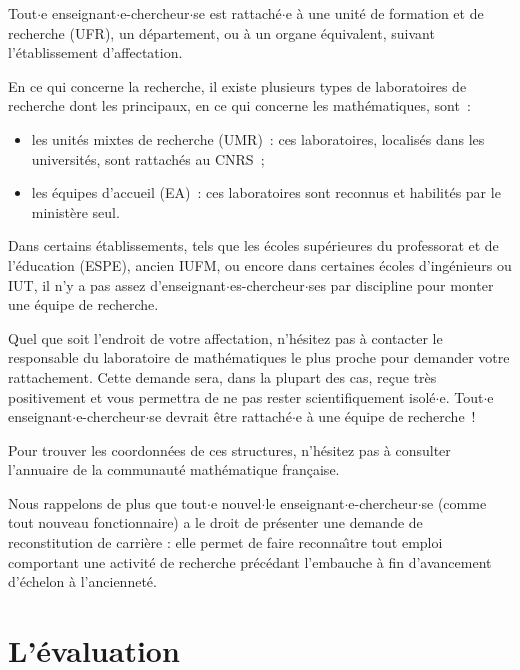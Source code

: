 Tout$\cdot$e enseignant$\cdot$e-chercheur$\cdot$se est rattach\'e$\cdot$e \`a une unit\'e de formation
et de recherche (UFR), un d\'epar\-te\-ment, ou \`a un organe
\'equivalent, suivant l'\'etablissement d'affectation.

En ce qui concerne la recherche, il existe plusieurs types de
laboratoires de recherche dont les principaux, en ce qui concerne
les math\'ematiques, sont~:
\begin{itemize}
	\item les unit\'es mixtes de recherche (UMR)~: ces laboratoires,
		localis\'es dans les universit\'es, sont rattach\'es au CNRS~;
	\item les \'equipes d'accueil (EA)~: ces laboratoires sont
		reconnus et habilit\'es par le minist\`ere seul.
\end{itemize}

Dans certains \'etablissements, tels que 
les \'ecoles supérieures du professorat et de l'\'education (ESPE), ancien IUFM,
ou encore dans
certaines \'ecoles d'ing\'enieurs ou IUT, il n'y a pas assez
d'enseignant$\cdot$es-chercheur$\cdot$ses par discipline pour monter une \'equipe de
recherche.

Quel que soit l'endroit de votre affectation, n'h\'esitez pas
\`a contacter le responsable du laboratoire de math\'e\-matiques le plus
proche pour demander votre rattachement. Cette demande sera, dans la
plupart des cas, re\c cue tr\`es positivement et vous permettra de ne
pas rester scientifiquement isol\'e$\cdot$e. Tout$\cdot$e enseignant$\cdot$e-chercheur$\cdot$se
devrait \^etre rattach\'e$\cdot$e \`a une \'equipe de
recherche~!

Pour trouver les coordonn\'ees de ces structures, n'h\'esitez pas \`a
consulter l'annuaire de la communaut\'e math\'e\-matique
fran\c caise. 

Nous rappelons de plus que tout$\cdot$e nouvel$\cdot$le enseignant$\cdot$e-chercheur$\cdot$se (comme tout nouveau fonctionnaire)
a le droit de pr\'esenter une demande de reconstitution de carri\`ere : elle permet de faire reconna\^\i tre tout emploi comportant une activit\'e de recherche pr\'ec\'edant l'embauche \`a fin d'avancement d'\'echelon \`a l'anciennet\'e.

\section{L'\'evaluation}

